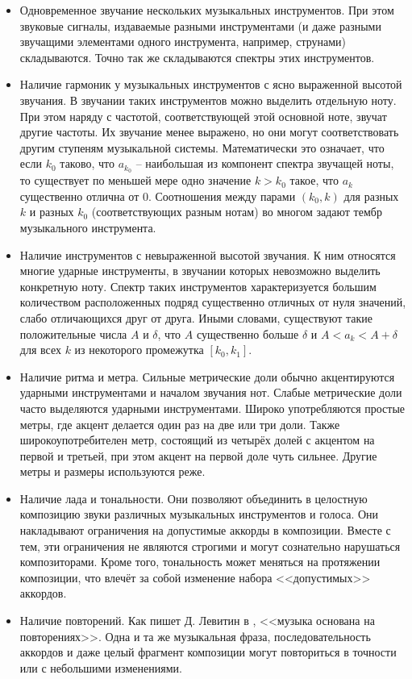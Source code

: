 \begin{itemize}
  \item Одновременное звучание нескольких музыкальных инструментов. При этом
  звуковые сигналы, издаваемые разными инструментами (и даже разными звучащими
  элементами одного инструмента, например, струнами) складываются. Точно так же
  складываются спектры этих инструментов.
  
  \item Наличие гармоник у музыкальных инструментов с ясно выраженной высотой
  звучания. В звучании таких инструментов можно выделить отдельную ноту. При
  этом наряду с частотой, соответствующей этой основной ноте, звучат другие
  частоты. Их звучание менее выражено, но они могут соответствовать другим
  ступеням музыкальной системы. Математически это означает, что если $k_0$
  таково, что $a_{k_0}$ -- наибольшая из компонент спектра звучащей ноты, то
  существует по меньшей мере одно значение $k > k_0$ такое, что $a_k$
  существенно отлична от 0. Соотношения между парами $(k_0, k)$ для разных $k$ и
  разных $k_0$ (соответствующих разным нотам) во многом задают тембр
  музыкального инструмента.
  
  \item Наличие инструментов с невыраженной высотой звучания. К ним относятся
  многие ударные инструменты, в звучании которых невозможно выделить конкретную
  ноту. Спектр таких инструментов характеризуется большим количеством
  расположенных подряд существенно отличных от нуля значений, слабо отличающихся
  друг от друга. Иными словами, существуют такие положительные числа $A$ и
  $\delta$, что $A$ существенно больше $\delta$ и $A < a_k < A + \delta$ для
  всех $k$ из некоторого промежутка $[k_0, k_1]$.
  
  \item Наличие ритма и метра. Сильные метрические доли обычно акцентируются
  ударными инструментами и началом звучания нот. Слабые метрические доли часто
  выделяются ударными инструментами. Широко употребляются простые метры, где
  акцент делается один раз на две или три доли. Также широкоупотребителен метр,
  состоящий из четырёх долей с акцентом на первой и третьей, при этом акцент на
  первой доле чуть сильнее. Другие метры и размеры используются реже.
  
  \item Наличие лада и тональности. Они позволяют объединить в целостную
  композицию звуки различных музыкальных инструментов и голоса. Они накладывают
  ограничения на допустимые аккорды в композиции. Вместе с тем, эти ограничения
  не являются строгими и могут сознательно нарушаться композиторами. Кроме того,
  тональность может меняться на протяжении композиции, что влечёт за собой
  изменение набора <<допустимых>> аккордов.
  
  \item Наличие повторений. Как пишет Д. Левитин в \cite{Levitin2006},
  <<музыка основана на повторениях>>. Одна и та же музыкальная фраза,
  последовательность аккордов и даже целый фрагмент композиции могут повториться
  в точности или с небольшими изменениями.
\end{itemize}

